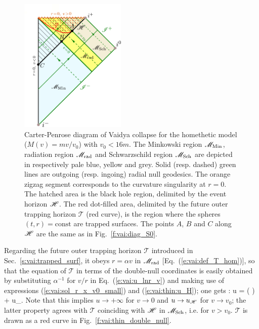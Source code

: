 \begin{figure}
\centerline{\includegraphics[width=0.45\textwidth]{vai_CPdiag_thin.pdf}}
\caption[]{\label{f:vai:CPdiag_thin} \footnotesize
Carter-Penrose diagram of Vaidya collapse
for the homethetic model ($M(v) = m v/v_0$) with $v_0 < 16m$.
The Minkowski region $\mathscr{M}_{\rm Min}$, radiation region $\mathscr{M}_{\rm rad}$
and Schwarzschild region $\mathscr{M}_{\rm Sch}$ are depicted in respectively
pale blue, yellow and grey.
Solid (resp. dashed) green lines are outgoing (resp. ingoing)
radial null geodesics.
The orange zigzag segment corresponds to the curvature
singularity at $r=0$. The hatched area is the black hole region,
delimited by the event horizon $\mathscr{H}$.
The red dot-filled area, delimited by the future outer trapping horizon
$\mathscr{T}$ (red curve),
is the region where the spheres $(t,r)=\mathrm{const}$
are trapped surfaces.
The points $A$, $B$ and $C$ along $\mathscr{H}$ are the same as in Fig.~\ref{f:vai:diag_S0}.
}
\end{figure}

Regarding the future outer trapping horizon $\mathscr{T}$ introduced in
Sec.~\ref{s:vai:trapped_surf}, it obeys $r=\alpha v$ in $\mathscr{M}_{\rm rad}$
[Eq.~(\ref{e:vai:def_T_hom})],
so that the equation
of $\mathscr{T}$ in terms of the double-null coordinates is easily obtained
by substituting $\alpha^{-1}$ for $v/r$ in Eq.~(\ref{e:vai:u_lnr_v})
and making use of expressions (\ref{e:vai:sol_r_x_v0_small}) and (\ref{e:vai:thin:u_H}); one gets
\be \label{e:vai:thin:trap_uv}
  : \qquad  u = \ln\left(  \right) + u_\Hor .
\ee
Note that this implies $u\to +\infty$ for $v\to 0$ and $u\to u_{\mathscr{H}}$
for $v\to v_0$; the latter property agrees with $\mathscr{T}$ coinciding
with $\mathscr{H}$ in $\mathscr{M}_{\rm Sch}$, i.e. for $v > v_0$.
$\mathscr{T}$ is drawn as a red curve in Fig.~\ref{f:vai:thin_double_null}.

